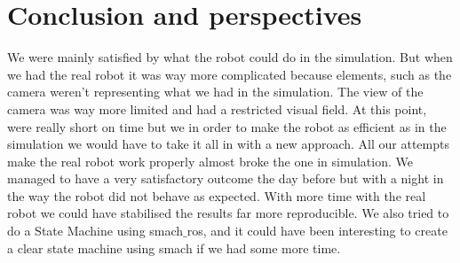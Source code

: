 \documentclass[conference]{IEEEtran}
\begin{document}
\section{Conclusion and perspectives}
We were mainly satisfied by what the robot could do in the simulation. But when we had the real robot it was way more complicated because elements, such as the camera weren't representing what we had in the simulation.  The view of the camera was way more limited and had a restricted visual field. At this point, were really short on time but we in order to make the robot as efficient as in the simulation we would have to take it all in with a new approach. All our attempts make the real robot work properly almost broke the one in simulation. We managed to have a very satisfactory outcome the day before but with a night in the way the robot did not behave as expected. With more time with the real robot we could have stabilised the results far more reproducible.
We also tried to do a State Machine using smach$\_$ros, and it could have been interesting to create a clear state machine using smach if we had some more time.
\end{document}
